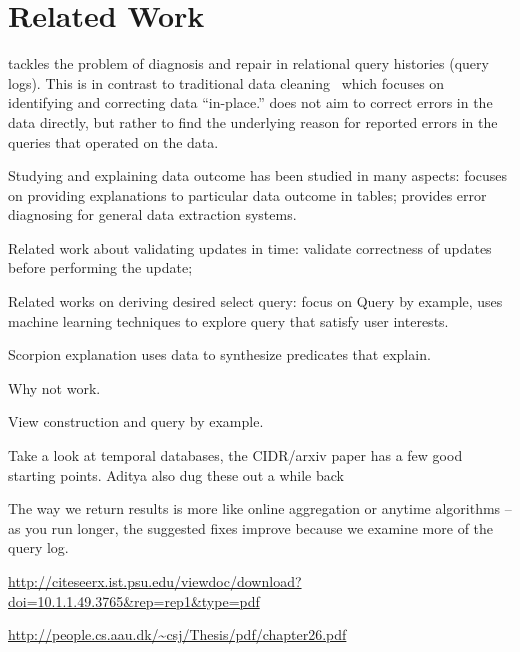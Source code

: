 
\section{Related Work}
\label{s:related}

\sys tackles the problem of diagnosis and repair in relational query
histories (query logs). This is in contrast to traditional data
cleaning~\cite{rahm00} which focuses on identifying and correcting
data ``in-place.'' \sys does not aim to correct errors in the data
directly, but rather to find the underlying reason for reported errors
in the queries that operated on the data. 

Studying and explaining
data outcome has been studied in many aspects: 
\cite{Golab2008, el2014interpretable} focuses on providing 
explanations to particular data outcome in tables; \cite{wang2015}
provides error diagnosing for general data extraction systems. 


Related work about validating updates in time: 
\cite{Chen2011} validate correctness of updates before performing the update;


Related works on deriving desired select query: focus on 
Query by example, \cite{dimitriadou2014explore}  uses machine learning
techniques to explore query that satisfy user interests. 


\cite{mucslu2013data}



Scorpion explanation uses data to synthesize predicates that explain.

Why not work.

View construction and query by example.

Take a look at temporal databases, the CIDR/arxiv paper has a few good starting points. Aditya also dug these out a while back


The way we return results is more like online aggregation or anytime algorithms -- 
as you run longer, the suggested fixes improve because we examine more of the query log.

\url{http://citeseerx.ist.psu.edu/viewdoc/download?doi=10.1.1.49.3765&rep=rep1&type=pdf}

\url{http://people.cs.aau.dk/~csj/Thesis/pdf/chapter26.pdf}
